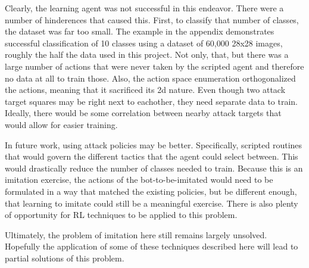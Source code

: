 \documentclass{amsart}
\theoremstyle{definition}
\begin{document}

Clearly, the learning agent was not successful in this endeavor.
There were a number of hinderences that caused this.
First, to classify that number of classes, the dataset was far too small.
The example in the appendix demonstrates successful classification of 10 classes using a dataset of 60,000 28x28 images, roughly the half the data used in this project.
Not only, that, but there was a large number of actions that were never taken by the scripted agent and therefore no data at all to train those.
Also, the action space enumeration orthogonalized the actions, meaning that it sacrificed its 2d nature.
Even though two attack target squares may be right next to eachother, they need separate data to train.
Ideally, there would be some correlation between nearby attack targets that would allow for easier training.

In future work, using attack policies may be better.
Specifically, scripted routines that would govern the different tactics that the agent could select between.
This would drastically reduce the number of classes needed to train.
Because this is an imitation exercise, the actions of the bot-to-be-imitated would need to be formulated in a way that matched the existing policies, but be different enough, that learning to imitate could still be a meaningful exercise.
There is also plenty of opportunity for RL techniques to be applied to this problem.

Ultimately, the problem of imitation here still remains largely unsolved.
Hopefully the application of some of these techniques described here will lead to partial solutions of this problem.










\end{document}
